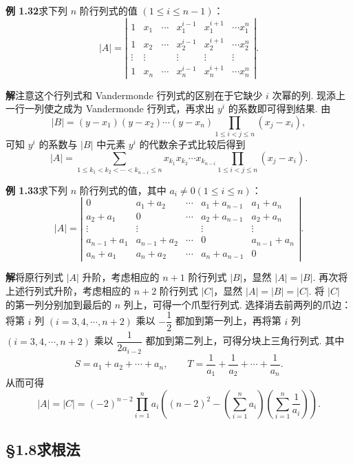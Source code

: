 \documentclass[UTF8,12pt,a4paper,fontset=fandol]{ctexart}
\begin{document}
\noindent\textbf{例 1.32}\quad 求下列 $n$ 阶行列式的值 $(1\le i\le n-1)$：
\[
|A|=\left|\begin{array}{cccccc}
1 & x_1 & \cdots & x_1^{i-1} & x_1^{i+1} & \cdots x_1^n\\
1 & x_2 & \cdots & x_2^{i-1} & x_2^{i+1} & \cdots x_2^n\\
\vdots & \vdots &        & \vdots & \vdots & \vdots\\
1 & x_n & \cdots & x_n^{i-1} & x_n^{i+1} & \cdots x_n^n
\end{array}\right|.
\]

\noindent\textbf{解}\quad 注意这个行列式和 Vandermonde 行列式的区别在于它缺少 $i$ 次幂的列. 现添上一行一列使之成为 Vandermonde 行列式，再求出 $y^i$ 的系数即可得到结果. 由
\[
|B|=(y-x_1)(y-x_2)\cdots(y-x_n)\prod_{1\le i<j\le n}(x_j-x_i),
\]
可知 $y^i$ 的系数与 $|B|$ 中元素 $y^i$ 的代数余子式比较后得到
\[
|A|=\sum_{1\le k_1<k_2<\cdots<k_{n-i}\le n}
x_{k_1}x_{k_2}\cdots x_{k_{n-i}}
\prod_{1\le i<j\le n}(x_j-x_i).
\]

\noindent\textbf{例 1.33}\quad 求下列 $n$ 阶行列式的值，其中 $a_i\ne0(1\le i\le n)$：
\[
|A|=\left|\begin{array}{ccccc}
0 & a_1+a_2 & \cdots & a_1+a_{n-1} & a_1+a_n\\
a_2+a_1 & 0 & \cdots & a_2+a_{n-1} & a_2+a_n\\
\vdots & \vdots &        & \vdots & \vdots\\
a_{n-1}+a_1 & a_{n-1}+a_2 & \cdots & 0 & a_{n-1}+a_n\\
a_n+a_1 & a_n+a_2 & \cdots & a_n+a_{n-1} & 0
\end{array}\right|.
\]

\noindent\textbf{解}\quad 将原行列式 $|A|$ 升阶，考虑相应的 $n+1$ 阶行列式 $|B|$，显然 $|A|=|B|$. 再次将上述行列式升阶，考虑相应的 $n+2$ 阶行列式 $|C|$，显然 $|A|=|B|=|C|$. 将 $|C|$ 的第一列分别加到最后的 $n$ 列上，可得一个爪型行列式. 选择消去前两列的爪边：将第 $i$ 列 $(i=3,4,\cdots,n+2)$ 乘以 $-\dfrac12$ 都加到第一列上，再将第 $i$ 列 $(i=3,4,\cdots,n+2)$ 乘以 $\dfrac1{2a_{i-2}}$ 都加到第二列上，可得分块上三角行列式. 其中
\[
S=a_1+a_2+\cdots+a_n,\qquad T=\frac1{a_1}+\frac1{a_2}+\cdots+\frac1{a_n}.
\]
从而可得
\[
|A|=|C|=(-2)^{n-2}\prod_{i=1}^n a_i
\left((n-2)^2-\left(\sum_{i=1}^n a_i\right)\left(\sum_{i=1}^n\frac1{a_i}\right)\right).
\]

\subsection*{§1.8\quad 求根法}
\end{document}
